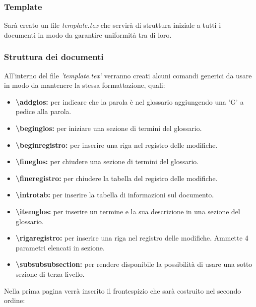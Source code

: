 \documentclass[a4paper,11pt]{article}
\begin{document}
			\subsubsection{Template}
			Sarà creato un file \textit{template.tex}  che servirà di struttura iniziale a tutti i documenti in modo da garantire uniformità tra di loro.
			\subsubsection{Struttura dei documenti}
			All'interno del file \textit{'template.tex'} verranno creati alcuni comandi generici da usare in modo da mantenere la stessa formattazione, quali:
			\begin{itemize}
			\item \textbf{\textbackslash addglos:} per indicare che la parola è nel glossario aggiungendo una 'G' a pedice alla parola.
			\item \textbf{\textbackslash beginglos:} per iniziare una sezione di termini del glossario.			
			\item \textbf{\textbackslash beginregistro:} per inserire una riga nel registro delle modifiche.  
			\item \textbf{\textbackslash fineglos:} per chiudere una sezione di termini del glossario. 
			\item \textbf{\textbackslash fineregistro:} per chiudere la tabella del registro delle modifiche.
			\item \textbf{\textbackslash introtab:}  per inserire la tabella di informazioni sul documento.
			\item \textbf{\textbackslash itemglos:} per inserire un termine e la sua descrizione in una sezione del glossario.
			\item \textbf{\textbackslash rigaregistro:} per inserire una riga nel registro delle modifiche. Ammette 4 parametri elencati in sezione.
			\item \textbf{\textbackslash subsubsubsection:}  per rendere disponibile la possibilità di usare una sotto sezione di terza livello.
			\end{itemize}
				Nella prima pagina verrà inserito il frontespizio che sarà costruito nel secondo ordine: 
\end{document}
